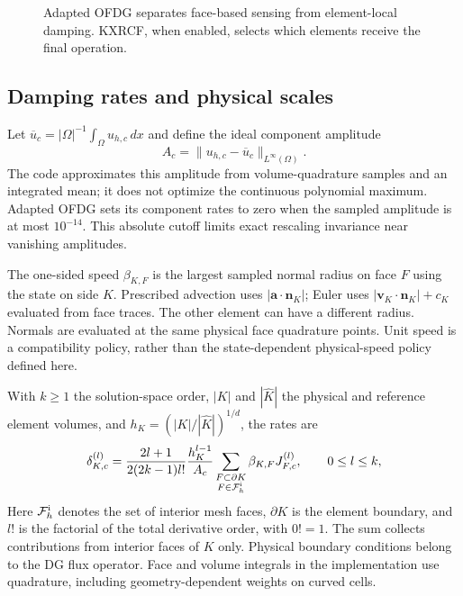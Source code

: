 \begin{figure}[htbp]
\centering
{}
\caption{Adapted OFDG separates face-based sensing from element-local damping.
KXRCF, when enabled, selects which elements receive the final operation.}
\label{fig:ofdg-pipeline}
\end{figure}

\subsection{Damping rates and physical scales}
\label{sec:ofdg-rates}
Let $\overline u_c=|\Omega|^{-1}\int_\Omega u_{h,c}\,dx$ and define the ideal
component amplitude
\begin{equation}
 A_c=\|u_{h,c}-\overline u_c\|_{L^\infty(\Omega)}.
 \label{eq:ofdg-global-scale}
\end{equation}
The code approximates this amplitude from volume-quadrature samples and an
integrated mean; it does not optimize the continuous polynomial maximum.
Adapted OFDG sets its component rates to zero when the sampled amplitude is
at most $10^{-14}$. This absolute cutoff limits exact rescaling invariance
near vanishing amplitudes.

The one-sided speed $\beta_{K,F}$ is the largest sampled normal radius on
face $F$ using the state on side $K$. Prescribed advection uses
$|\boldsymbol a\cdot\boldsymbol n_K|$; Euler uses
$|\boldsymbol v_K\cdot\boldsymbol n_K|+c_K$ evaluated from face traces.
The other element can have a different radius. Normals are evaluated at the
same physical face quadrature points. Unit speed is a compatibility policy,
rather than the state-dependent physical-speed policy defined here.

With $k\geq1$ the solution-space order, $|K|$ and $|\widehat K|$ the
physical and reference element volumes, and
$h_K=(|K|/|\widehat K|)^{1/d}$, the rates are
\begin{equation}
 \delta_{K,c}^{(l)}=
 \frac{2l+1}{2(2k-1)l!}\frac{h_K^{l-1}}{A_c}
 \sum_{\substack{F\subset\partial K\\F\in\mathcal F_h^{\rm i}}}
 \beta_{K,F}J_{F,c}^{(l)},\qquad 0\leq l\leq k,
 \label{eq:ofdg-damping-rate}
\end{equation}
Here $\mathcal F_h^{\rm i}$ denotes the set of interior mesh faces,
$\partial K$ is the element boundary, and $l!$ is the factorial of the total
derivative order, with $0!=1$. The sum collects contributions from interior
faces of $K$ only. Physical boundary conditions
belong to the DG flux operator. Face and volume integrals in the implementation
use quadrature, including geometry-dependent weights on curved cells.

